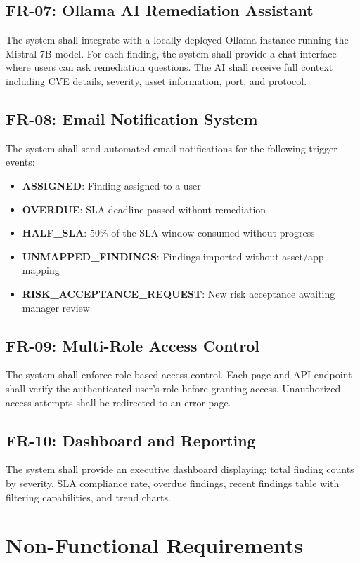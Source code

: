 \subsection{FR-07: Ollama AI Remediation Assistant}
The system shall integrate with a locally deployed Ollama instance running the Mistral 7B model. For each finding, the system shall provide a chat interface where users can ask remediation questions. The AI shall receive full context including CVE details, severity, asset information, port, and protocol.

\subsection{FR-08: Email Notification System}
The system shall send automated email notifications for the following trigger events:
\begin{itemize}
  \item \textbf{ASSIGNED}: Finding assigned to a user
  \item \textbf{OVERDUE}: SLA deadline passed without remediation
  \item \textbf{HALF\_SLA}: 50\% of the SLA window consumed without progress
  \item \textbf{UNMAPPED\_FINDINGS}: Findings imported without asset/app mapping
  \item \textbf{RISK\_ACCEPTANCE\_REQUEST}: New risk acceptance awaiting manager review
\end{itemize}

\subsection{FR-09: Multi-Role Access Control}
The system shall enforce role-based access control. Each page and API endpoint shall verify the authenticated user's role before granting access. Unauthorized access attempts shall be redirected to an error page.

\subsection{FR-10: Dashboard and Reporting}
The system shall provide an executive dashboard displaying: total finding counts by severity, SLA compliance rate, overdue findings, recent findings table with filtering capabilities, and trend charts.

\section{Non-Functional Requirements}

